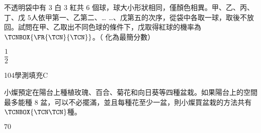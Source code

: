 \begin{QUESTIONS}
\begin{QUESTION}
        \begin{ExamAnsRateInfo}{39}{64}{35}{18}
        \end{ExamAnsRateInfo}
        \begin{QBODY}
            不透明袋中有 $3$ 白 $3$ 紅共 $6$ 個球，球大小形狀相同，僅顏色相異。甲、乙、丙、丁、戊 $5$人依甲第一、乙第二、… …、戊第五的次序，從袋中各取一球，取後不放回。試問在甲、乙取出不同色球的條件下，戊取得紅球的機率為$\TCNBOX{\FR{\TCN}{\TCN}}$。（ 化為最簡分數）
        \end{QBODY}
        \begin{QFROMS}
        \end{QFROMS}
        \begin{QTAGS}\end{QTAGS}
        \begin{QANS}
            $\dfrac{1}{2}$
        \end{QANS}
        \begin{QSOLLIST}
        \end{QSOLLIST}
        \begin{QEMPTYSPACE}
        \end{QEMPTYSPACE}
    \end{QUESTION}
    \begin{QUESTION}
        \begin{ExamInfo}{104}{學測}{填充}{C}
        \end{ExamInfo}
        \begin{ExamAnsRateInfo}{21}{49}{11}{3}
        \end{ExamAnsRateInfo}
        \begin{QBODY}
            小燦預定在陽台上種植玫瑰、百合、菊花和向日葵等四種盆栽。如果陽台上的空間最多能種 $8$ 盆，可以不必擺滿，並且每種花至少一盆，則小燦買盆栽的方法共有$\TCNBOX{\TCN\TCN}$種。
        \end{QBODY}
        \begin{QFROMS}
        \end{QFROMS}
        \begin{QTAGS}\end{QTAGS}
        \begin{QANS}
            $70$
        \end{QANS}
        \begin{QSOLLIST}
        \end{QSOLLIST}
        \begin{QEMPTYSPACE}
        \end{QEMPTYSPACE}

\end{QUESTION}
\end{QUESTIONS}
